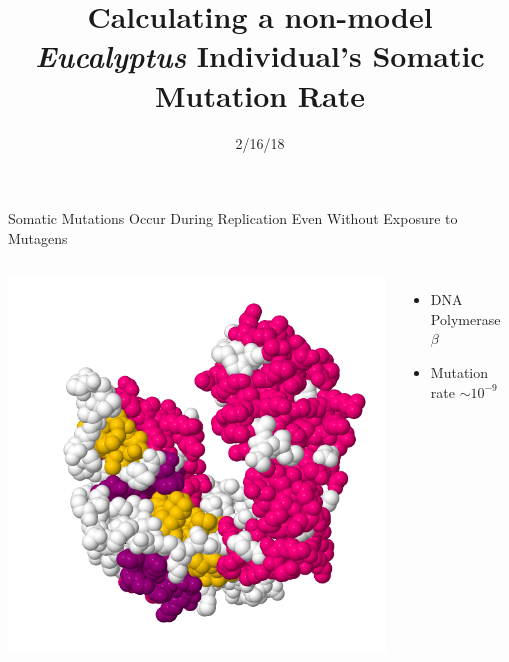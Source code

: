 \documentclass{beamer}
\title[Eucalyptus Somatic Mutation]{Calculating a non-model \textit{Eucalyptus} Individual's Somatic Mutation Rate}
\date{2/16/18}
\author{Adam Orr\hskip 1em \faicon{twitter}@AdamJOrr}
\begin{document}
\frame{\titlepage}


\begin{frame}{Somatic Mutations Occur During Replication Even Without Exposure to Mutagens}
\begin{columns}
		\includegraphics[width=\linewidth]{dnapol_beta.png}
		\begin{itemize}
			\item DNA Polymerase $\beta$
			\item Mutation rate $\sim10^{-9}$
		\end{itemize}
		\vskip 3in
\end{columns}
\end{frame}
\end{document}
